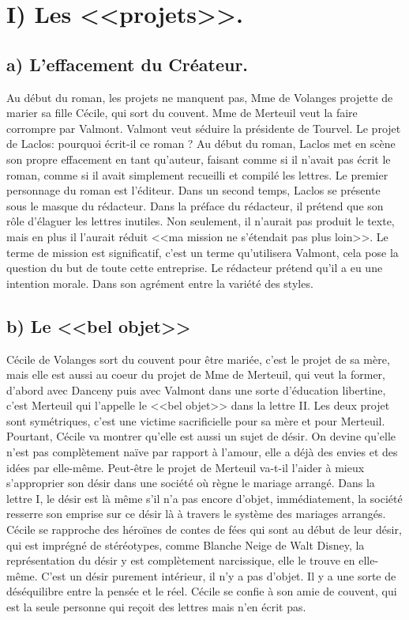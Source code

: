 \documentclass[12pt]{article}
\begin{document}
\section*{\color{red}I) Les <<projets>>.}
\subsection*{a) L'effacement du Créateur.}
Au début du roman, les projets ne manquent pas, Mme de Volanges projette de marier sa fille Cécile, qui sort du couvent.
Mme de Merteuil veut la faire corrompre par Valmont.
Valmont veut séduire la présidente de Tourvel.
Le projet de Laclos: pourquoi écrit-il ce roman ?
Au début du roman, Laclos met en scène son propre effacement en tant qu'auteur, faisant comme si il n'avait pas écrit le roman, comme si il avait simplement recueilli et compilé les lettres.
Le premier personnage du roman est l'éditeur.
Dans un second temps, Laclos se présente sous le masque du rédacteur.
Dans la préface du rédacteur, il prétend que son rôle d'élaguer les lettres inutiles.
Non seulement, il n'aurait pas produit le texte, mais en plus il l'aurait réduit <<ma mission ne s'étendait pas plus loin>>.
Le terme de mission est significatif, c'est un terme qu'utilisera Valmont, cela pose la question du but de toute cette entreprise.
Le rédacteur prétend qu'il a eu une intention morale.
Dans son agrément entre la variété des styles.
\pagebreak

\subsection*{b) Le <<bel objet>>}
Cécile de Volanges sort du couvent pour être mariée, c'est le projet de sa mère, mais elle est aussi au coeur du projet de Mme de Merteuil, qui veut la former, d'abord avec Danceny puis avec Valmont dans une sorte d'éducation libertine, c'est Merteuil qui l'appelle le <<bel objet>> dans la lettre II.
Les deux projet sont symétriques, c'est une victime sacrificielle pour sa mère et pour Merteuil.
Pourtant, Cécile va montrer qu'elle est aussi un sujet de désir. On devine qu'elle n'est pas complètement naïve par rapport à l'amour, elle a déjà des envies et des idées par elle-même.
Peut-être le projet de Merteuil va-t-il l'aider à mieux s'approprier son désir dans une société où règne le mariage arrangé.
Dans la lettre I, le désir est là même s'il n'a pas encore d'objet, immédiatement, la société resserre son emprise sur ce désir là à travers le système des mariages arrangés.
Cécile se rapproche des héroïnes de contes de fées qui sont au début de leur désir, qui est imprégné de stéréotypes, comme Blanche Neige de Walt Disney, la représentation du désir y est complètement narcissique, elle le trouve en elle-même.
C'est un désir purement intérieur, il n'y a pas d'objet. Il y a une sorte de déséquilibre entre la pensée et le réel.
Cécile se confie à son amie de couvent, qui est la seule personne qui reçoit des lettres mais n'en écrit pas.
\end{document}
